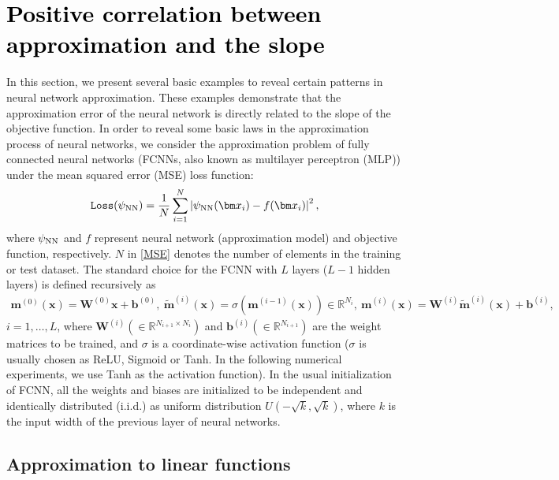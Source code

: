 \documentclass[final]{siamart220329}
\newtheorem{theoretical insights}{Theoretical insights}
\newtheorem{practical takeaway}{Practical takeaway}
\begin{document}
\section{\textcolor{black}{
Positive correlation between approximation and the slope}}\label{motvation}



{\color{black} In this section, we present several basic examples to reveal certain patterns in neural network approximation. These examples demonstrate that the approximation error of the neural network is directly related to the slope of the objective function.} 
In order to reveal some basic laws in the approximation process of neural networks, we consider the approximation problem of fully connected neural networks (FCNNs, also known as multilayer perceptron (MLP)) under the mean squared error (MSE) loss function:
\begin{equation}\label{MSE}
    \texttt{Loss}(\psi_{\rm NN})=\frac{1}{N}\sum_{i=1}^N\left|\psi_{\rm NN}({\bm x}_i)-f({\bm x}_i)\right|^2,
\end{equation}
where $\psi_{\rm NN}$ and $f$ represent neural network (approximation model) and objective function, respectively. $N$ in \eqref{MSE} denotes the number of elements in the training or test dataset. {The} standard choice for the FCNN with $L$ layers ($L-1$ hidden layers) is defined recursively as 
\begin{equation*}
\begin{aligned}
\bm{m}^{(0)}({\bm x})=\bm{W}^{(0)}\bm{x}+\bm{b}^{(0)},\ 
\bm{\tilde{m}}^{(i)}({\bm x})=\sigma(\bm{m}^{(i-1)}({\bm x}))\in\mathbb{R}^{N_i},\ 
\bm{m}^{(i)}({\bm x})=\bm{W}^{(i)}\bm{\tilde{m}}^{(i)}({\bm x})+\bm{b}^{(i)},
\end{aligned}
\end{equation*} 
$i=1,\dots, L$, where $\bm{W}^{(i)}(\in\mathbb{R}^{N_{i+1}\times N_{i}})$ and $\boldsymbol{b}^{(i)}(\in\mathbb{R}^{N_{i+1}})$ are the weight matrices to be trained, and $\sigma$ is a coordinate-wise activation function ($\sigma$ is usually chosen as ReLU, Sigmoid or Tanh. In the following numerical experiments, we use Tanh as the activation function). In the usual initialization of FCNN, all the weights and biases are initialized to be independent and identically distributed (i.i.d.) as uniform distribution $U(-\sqrt{k},\sqrt{k})$, where $k$ is the input width of the previous layer of neural networks. 
 

\subsection{Approximation to linear functions}\label{eg_lin}
\end{document}
